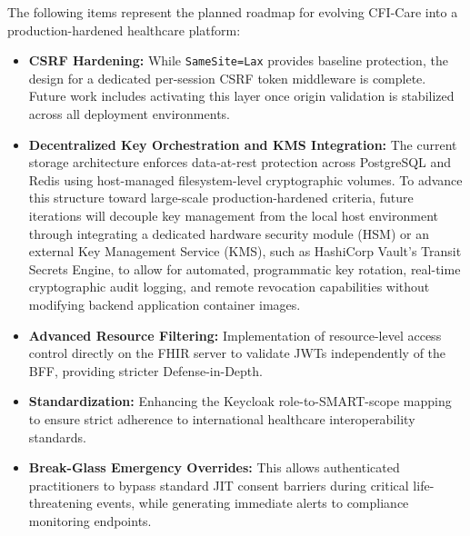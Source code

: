 The following items represent the planned roadmap for evolving CFI-Care into a production-hardened healthcare platform:

\begin{itemize}
    \item \textbf{\ac{CSRF} Hardening:} While \texttt{SameSite=Lax} provides baseline protection, the design for a dedicated per-session \ac{CSRF} token middleware is complete. Future work includes activating this layer once origin validation is stabilized across all deployment environments.
    \item \textbf{Decentralized Key Orchestration and KMS Integration:} The current storage architecture enforces data-at-rest protection across PostgreSQL and Redis using host-managed filesystem-level cryptographic volumes. 
    To advance this structure toward large-scale production-hardened criteria, future iterations will decouple key management from the local host environment through integrating a dedicated hardware security module (HSM) or an external Key Management Service (KMS), such as HashiCorp Vault's Transit Secrets Engine, to allow for automated, programmatic key rotation, real-time cryptographic audit logging, and remote revocation capabilities without modifying backend application container images.
    \item \textbf{Advanced Resource Filtering:} Implementation of resource-level access control directly on the \ac{FHIR} server to validate \acp{JWT} independently of the BFF, providing stricter Defense-in-Depth.
    \item \textbf{Standardization:} Enhancing the Keycloak role-to-SMART-scope mapping to ensure strict adherence to international healthcare interoperability standards.
    \item \textbf{Break-Glass Emergency Overrides:} This allows authenticated practitioners to bypass standard JIT consent barriers during critical life-threatening events, while generating immediate alerts to compliance monitoring endpoints.
\end{itemize}



